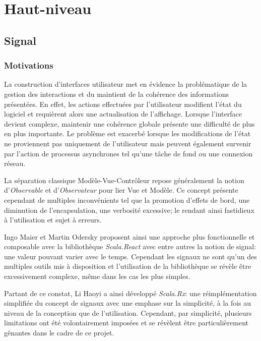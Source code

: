 \chapter{Haut-niveau}

\section{Signal}

\subsection{Motivations}

La construction d'interfaces utilisateur met en évidence la problématique de la gestion des interactions et du maintient de la cohérence des informations présentées. En effet, les actions effectuées par l'utilisateur modifient l'état du logiciel et requièrent alors une actualisation de l'affichage. Lorsque l'interface devient complexe, maintenir une cohérence globale présente une difficulté de plus en plus importante. Le problème est exacerbé lorsque les modifications de l'état ne proviennent pas uniquement de l'utilisateur mais peuvent également survenir par l'action de processus asynchrones tel qu'une tâche de fond ou une connexion réseau.

La séparation classique Modèle-Vue-Contrôleur repose généralement la notion d'\emph{Observable} et d'\emph{Observateur} pour lier Vue et Modèle. Ce concept présente cependant de multiples inconvénients tel que la promotion d'effets de bord, une diminution de l'encapsulation, une verbosité excessive; le rendant ainsi fastidieux à l'utilisation et sujet à erreurs\cite{odersky2012}.

Ingo Maier et Martin Odersky proposent ainsi une approche plus fonctionnelle et composable avec la bibliothèque \emph{Scala.React}\cite{scala-react} avec entre autres la notion de signal: une valeur pouvant varier avec le temps. Cependant les signaux ne sont qu'un des multiples outils mis à disposition et l'utilisation de la bibliothèque se révèle être excessivement complexe, même dans les cas les plus simples\cite[\small Related~Work]{scala.rx}.

Partant de ce constat, Li Haoyi a ainsi développé \emph{Scala.Rx}\cite{scala.rx}: une réimplémentation simplifiée du concept de signaux avec une emphase sur la simplicité, à la fois au niveau de la conception que de l'utilisation. Cependant, par simplicité, plusieurs limitations ont été volontairement imposées et se révèlent être particulièrement gênantes dans le cadre de ce projet.

